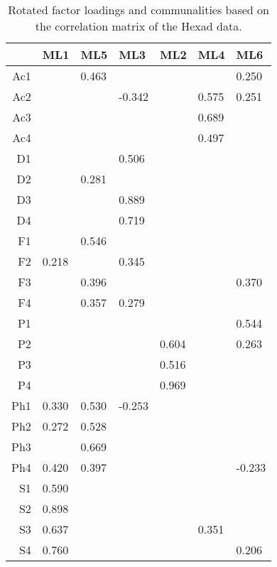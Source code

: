 \begin{table}[ht]
\centering
\begin{tabular}{rllllll}
  \toprule
 & {\textbf{ML1}} & {\textbf{ML5}} & {\textbf{ML3}} & {\textbf{ML2}} & {\textbf{ML4}} & {\textbf{ML6}} \\ 
  \midrule
Ac1 &        &  0.463 &        &        &        &  0.250 \\ 
  Ac2 &        &        & -0.342 &        &  0.575 &  0.251 \\ 
  Ac3 &        &        &        &        &  0.689 &        \\ 
  Ac4 &        &        &        &        &  0.497 &        \\ 
  D1 &        &        &  0.506 &        &        &        \\ 
  D2 &        &  0.281 &        &        &        &        \\ 
  D3 &        &        &  0.889 &        &        &        \\ 
  D4 &        &        &  0.719 &        &        &        \\ 
  F1 &        &  0.546 &        &        &        &        \\ 
  F2 &  0.218 &        &  0.345 &        &        &        \\ 
  F3 &        &  0.396 &        &        &        &  0.370 \\ 
  F4 &        &  0.357 &  0.279 &        &        &        \\ 
  P1 &        &        &        &        &        &  0.544 \\ 
  P2 &        &        &        &  0.604 &        &  0.263 \\ 
  P3 &        &        &        &  0.516 &        &        \\ 
  P4 &        &        &        &  0.969 &        &        \\ 
  Ph1 &  0.330 &  0.530 & -0.253 &        &        &        \\ 
  Ph2 &  0.272 &  0.528 &        &        &        &        \\ 
  Ph3 &        &  0.669 &        &        &        &        \\ 
  Ph4 &  0.420 &  0.397 &        &        &        & -0.233 \\ 
  S1 &  0.590 &        &        &        &        &        \\ 
  S2 &  0.898 &        &        &        &        &        \\ 
  S3 &  0.637 &        &        &        &  0.351 &        \\ 
  S4 &  0.760 &        &        &        &        &  0.206 \\ 
   \bottomrule
\end{tabular}
\caption{Rotated factor loadings and communalities based on the correlation matrix of the Hexad data.} 
\label{tab:loadingshex}
\end{table}
